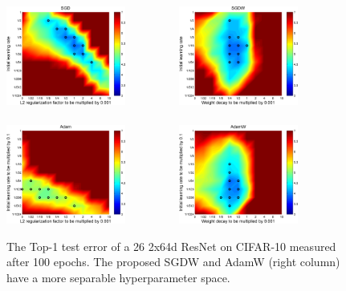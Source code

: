 \documentclass[usenames,dvipsnames]{article} %
\begin{document}
\begin{figure}[t]
\begin{center}
    \includegraphics[width=0.35\textwidth]{fig2_SGD.pdf} $\;\;$~~~~~~~
  \includegraphics[width=0.35\textwidth]{mSGD.pdf}\\
	$\;\;$\\
	\includegraphics[width=0.35\textwidth]{fig2_ADAM.pdf} $\;\;$~~~~~~~
  \includegraphics[width=0.35\textwidth]{mADAM_widefig.pdf}
\caption{\label{fig2_hyp100epochs} The Top-1 test error of a 26 2x64d ResNet on CIFAR-10 measured after 100 epochs. The proposed SGDW and AdamW (right column)  have a more separable hyperparameter space.}
\vspace*{-0.25cm}
\end{center}
\end{figure}
\end{document}

